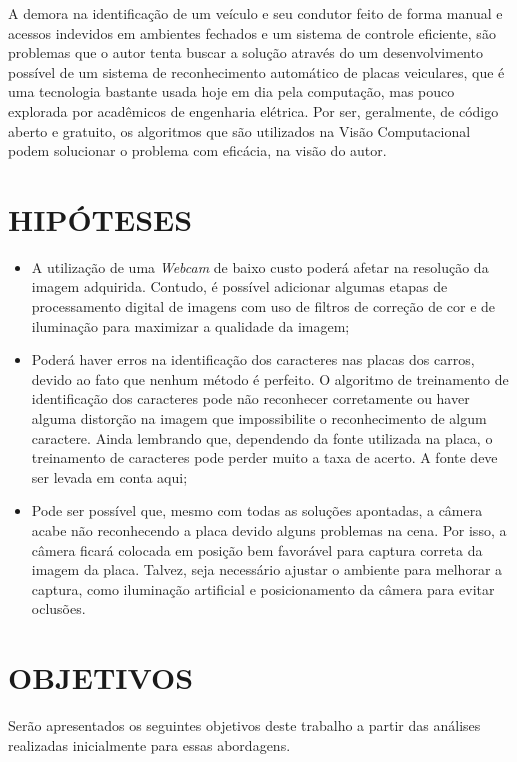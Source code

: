 A demora na identificação de um veículo e seu condutor feito de forma manual e acessos indevidos em ambientes fechados e um sistema de controle eficiente, são problemas que o autor tenta buscar a solução através do um desenvolvimento possível de um sistema de reconhecimento automático de placas veiculares, que é uma tecnologia bastante usada hoje em dia pela computação, mas pouco explorada por acadêmicos de engenharia elétrica. Por ser, geralmente, de código aberto e gratuito, os algoritmos que são utilizados na Visão Computacional podem solucionar o problema com eficácia, na visão do autor.  

\section{\uppercase{Hipóteses}}

\begin{itemize}
	\item A utilização de uma \textit{Webcam} de baixo custo poderá afetar na resolução da imagem adquirida. Contudo, é possível adicionar algumas etapas de processamento digital de imagens com uso de filtros de correção de cor e de iluminação para maximizar a qualidade da imagem;
	\item Poderá haver erros na identificação dos caracteres nas placas dos carros, devido ao fato que nenhum método é perfeito. O algoritmo de treinamento de identificação dos caracteres pode não reconhecer corretamente ou haver alguma distorção na imagem que impossibilite o reconhecimento de algum caractere. Ainda lembrando que, dependendo da fonte utilizada na placa, o treinamento de caracteres pode perder muito a taxa de acerto. A fonte deve ser levada em conta aqui;
	\item Pode ser possível que, mesmo com todas as soluções apontadas, a câmera acabe não reconhecendo a placa devido alguns problemas na cena. Por isso, a câmera ficará colocada em posição bem favorável para captura correta da imagem da placa. Talvez, seja necessário ajustar o ambiente para melhorar a captura, como iluminação artificial e posicionamento da câmera para evitar oclusões.
\end{itemize}

\section{\uppercase{Objetivos}}
Serão apresentados os seguintes objetivos deste trabalho a partir das análises realizadas inicialmente para essas abordagens.

